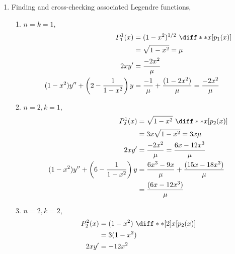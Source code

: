 \begin{enumerate}
    \item Finding and cross-checking associated Legendre functions,
          \begin{enumerate}
              \item $ n = k = 1 $,
                    \begin{align}
                        P_1^1 (x) & = (1 - x^2)^{1/2}\ \diff**{x}{\left[
                        p_1(x) \right]}                                       \\
                                  & = \sqrt{1 - x^2} = \mu                    \\
                        2xy'      & = \frac{-2x^2}{\mu}                       \\
                        (1 - x^2)y'' + \left( 2 - \frac{1}{1-x^2} \right)y
                                  & = \frac{-1}{\mu} + \frac{(1 - 2x^2)}{\mu}
                        = \frac{-2x^2}{\mu}
                    \end{align}
              \item $ n = 2, k = 1 $,
                    \begin{align}
                        P_2^1 (x) & = \sqrt{1 - x^2}\ \diff**{x}{\left[
                        p_2(x) \right]}                                                 \\
                                  & = 3x \sqrt{1 - x^2} = 3x\mu                         \\
                        2xy'      & = \frac{-2x^2}{\mu}
                        = \frac{6x - 12x^3}{\mu}                                        \\
                        (1 - x^2)y'' + \left(6 - \frac{1}{1-x^2} \right)y
                                  & = \frac{6x^3 - 9x}{\mu} + \frac{(15x - 18x^3)}{\mu} \\
                                  & = \frac{(6x - 12x^3)}{\mu}
                    \end{align}
              \item $ n = 2, k = 2 $,
                    \begin{align}
                        P_2^2 (x) & = (1 - x^2)\ \diff**[2]{x}{\left[
                        p_2(x) \right]}                               \\
                                  & = 3(1 - x^2)                      \\
                        2xy'      & = -12x^2                          \\

\end{align}
\end{enumerate}
\end{enumerate}

